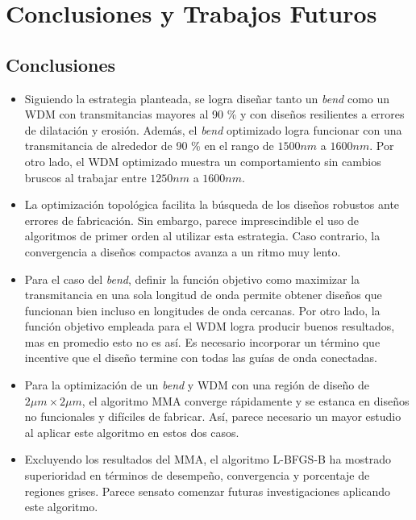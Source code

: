 \chapter{Conclusiones y Trabajos Futuros}\label{chapter:conclutions}

\section{Conclusiones}

\begin{itemize}

  \item Siguiendo la estrategia planteada, se logra diseñar tanto un \emph{bend} 
        como un WDM con transmitancias mayores al 90 \% y
        con diseños resilientes a errores de dilatación y erosión.
        Además, el \emph{bend} optimizado logra funcionar con una transmitancia de alrededor de 90 \%
        en el rango de $1500nm$ a $1600 nm$. 
        Por otro lado, el WDM optimizado muestra un comportamiento
        sin cambios bruscos al trabajar entre $1250 nm$ a $1600 nm$.

  \item La optimización topológica facilita la búsqueda de los diseños robustos
        ante errores de fabricación.
        Sin embargo, parece imprescindible el uso de algoritmos de primer orden al utilizar
        esta estrategia. 
        Caso contrario, la convergencia a diseños compactos avanza a un ritmo muy lento.

  \item Para el caso del \emph{bend}, definir la función objetivo 
        como maximizar la transmitancia en una sola longitud de onda
        permite obtener diseños que funcionan bien incluso en longitudes de
        onda cercanas. 
        Por otro lado, la función objetivo empleada para el WDM 
        logra producir buenos resultados, mas en promedio esto no es así.
        Es necesario incorporar un término que incentive que el diseño
        termine con todas las guías de onda conectadas.

  \item Para la optimización de un \emph{bend} y WDM con una región de diseño de $2 \mu m \times 2 \mu m$,
        el algoritmo MMA converge rápidamente y se estanca en diseños no funcionales y
        difíciles de fabricar. Así, parece necesario un mayor estudio al aplicar
        este algoritmo en estos dos casos.

  \item Excluyendo los resultados del MMA, el algoritmo L-BFGS-B ha mostrado superioridad
        en términos de desempeño, convergencia y porcentaje de regiones grises. 
        Parece sensato comenzar futuras investigaciones aplicando este algoritmo.


\end{itemize}
